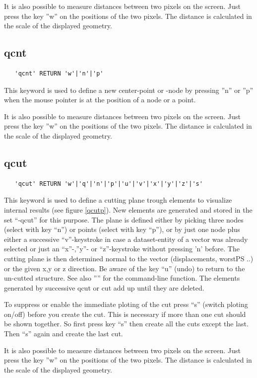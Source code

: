 \documentclass{article}
\begin{document}
It is also possible to measure distances between two pixels on the screen. Just press the key ''w'' on the positions of the two pixels. The distance is calculated in the scale of the displayed geometry.

\subsection{\label{qcnt}qcnt}
\begin{verbatim}
   'qcnt' RETURN 'w'|'n'|'p' 
\end{verbatim}
This keyword is used to define a new center-point or -node by pressing ''n'' or ''p'' when the mouse pointer is at the position of a node or a point.
 
It is also possible to measure distances between two pixels on the screen. Just press the key ''w'' on the positions of the two pixels. The distance is calculated in the scale of the displayed geometry.

\subsection{\label{qcut}qcut}
\begin{verbatim}
   'qcut' RETURN 'w'|'q'|'n'|'p'|'u'|'v'|'x'|'y'|'z'|'s'
\end{verbatim}
This keyword is used to define a cutting plane trough elements to visualize internal results (see figure \ref{qcutp}). New elements are generated and stored in the set ``-qcut'' for this purpose. The plane is defined either by picking three nodes (select with key ``n'') or points (select with key ``p''), or by just one node plus either a successive ``v''-keystroke in case a dataset-entity of a vector was already selected or just an ``x''-,''y''- or ``z''-keystroke without pressing 'n' before. The cutting plane is then determined normal to the vector (displacements, worstPS ..) or the given x,y or z direction. Be aware of the key ``u'' (undo) to return to the un-cutted structure. See also '''' for the command-line function. The elements generated by successive qcut or cut add up until they are deleted.

To suppress or enable the immediate ploting of the cut press ``s'' (switch ploting on/off) before you create the cut. This is necessary if more than one cut should be shown together. So first press key ``s'' then create all the cuts except the last. Then ``s'' again and create the last cut.
 
It is also possible to measure distances between two pixels on the screen. Just press the key ''w'' on the positions of the two pixels. The distance is calculated in the scale of the displayed geometry.
  
\end{document}
